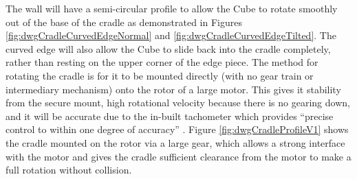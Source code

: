 \documentclass{report}
\begin{document}
	The wall will have a semi-circular profile to allow the Cube to rotate smoothly out of the base of the cradle as demonstrated in Figures \ref{fig:dwgCradleCurvedEdgeNormal} and \ref{fig:dwgCradleCurvedEdgeTilted}. The curved edge will also allow the Cube to slide back into the cradle completely, rather than resting on the upper corner of the edge piece. The method for rotating the cradle is for it to be mounted directly (with no gear train or intermediary mechanism) onto the rotor of a large motor. This gives it stability from the secure mount, high rotational velocity because there is no gearing down, and it will be accurate due to the in-built tachometer which provides \enquote{precise control to within one degree of accuracy} \cite{Lego}. Figure \ref{fig:dwgCradleProfileV1} shows the cradle mounted on the rotor via a large gear, which allows a strong interface with the motor and gives the cradle sufficient clearance from the motor to make a full rotation without collision.
    
\end{document}
